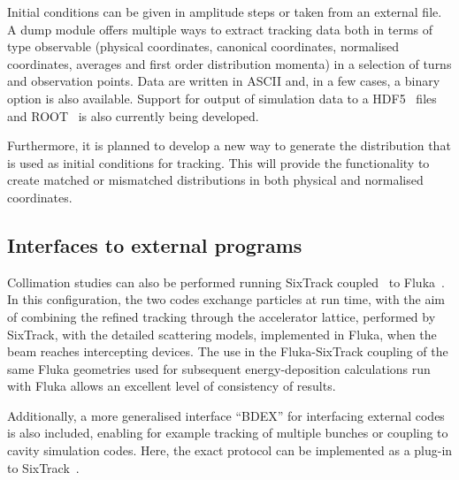 \documentclass[a4paper,
              ]{jacow}
\begin{document}
Initial conditions can be given in amplitude steps or taken from an external file. A dump module offers multiple ways to extract tracking data both in terms of type observable (physical coordinates, canonical coordinates, normalised coordinates, averages and first order distribution momenta) in a selection of turns and observation points. Data are written in ASCII and, in a few cases, a binary option is also available. Support for output of simulation data to a HDF5~\cite{hdf5} files and ROOT~\cite{root} is also currently being developed.

Furthermore, it is planned to develop a new way to generate the distribution that is used as initial conditions for tracking. This will provide the functionality to create matched or mismatched distributions in both physical and normalised coordinates.

\subsection{Interfaces to external programs}

Collimation studies can also be performed running SixTrack coupled~\cite{flukaCouplingVV} to Fluka~\cite{FLUKA1,FLUKA2}. In this configuration, the two codes exchange particles at run time, with the aim of combining the refined tracking through the accelerator lattice, performed by SixTrack, with the detailed scattering models, implemented in Fluka, when the beam reaches intercepting devices. The use in the Fluka-SixTrack coupling of the same Fluka geometries used for subsequent energy-deposition calculations run with Fluka allows an excellent level of consistency of results.

Additionally, a more generalised interface ``BDEX'' for interfacing external codes is also included, enabling for example tracking of multiple bunches or coupling to cavity simulation codes.
Here, the exact protocol can be implemented as a plug-in to SixTrack~\cite{recentDevels2}.

\end{document}
